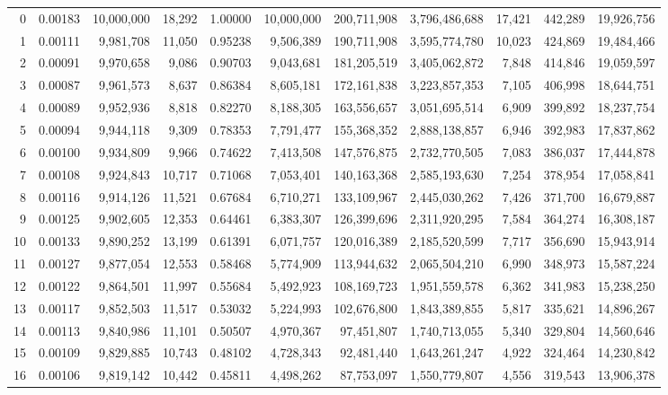 \begin{landscape}
\begin{longtable}{rrrrrrrrrrr}
0 & 0.00183 & 10,000,000 & 18,292 & 1.00000 & 10,000,000 & 200,711,908 & 3,796,486,688 & 17,421 & 442,289 & 19,926,756 \\
1 & 0.00111 & 9,981,708 & 11,050 & 0.95238 & 9,506,389 & 190,711,908 & 3,595,774,780 & 10,023 & 424,869 & 19,484,466 \\
2 & 0.00091 & 9,970,658 & 9,086 & 0.90703 & 9,043,681 & 181,205,519 & 3,405,062,872 & 7,848 & 414,846 & 19,059,597 \\
3 & 0.00087 & 9,961,573 & 8,637 & 0.86384 & 8,605,181 & 172,161,838 & 3,223,857,353 & 7,105 & 406,998 & 18,644,751 \\
4 & 0.00089 & 9,952,936 & 8,818 & 0.82270 & 8,188,305 & 163,556,657 & 3,051,695,514 & 6,909 & 399,892 & 18,237,754 \\
5 & 0.00094 & 9,944,118 & 9,309 & 0.78353 & 7,791,477 & 155,368,352 & 2,888,138,857 & 6,946 & 392,983 & 17,837,862 \\
6 & 0.00100 & 9,934,809 & 9,966 & 0.74622 & 7,413,508 & 147,576,875 & 2,732,770,505 & 7,083 & 386,037 & 17,444,878 \\
7 & 0.00108 & 9,924,843 & 10,717 & 0.71068 & 7,053,401 & 140,163,368 & 2,585,193,630 & 7,254 & 378,954 & 17,058,841 \\
8 & 0.00116 & 9,914,126 & 11,521 & 0.67684 & 6,710,271 & 133,109,967 & 2,445,030,262 & 7,426 & 371,700 & 16,679,887 \\
9 & 0.00125 & 9,902,605 & 12,353 & 0.64461 & 6,383,307 & 126,399,696 & 2,311,920,295 & 7,584 & 364,274 & 16,308,187 \\
10 & 0.00133 & 9,890,252 & 13,199 & 0.61391 & 6,071,757 & 120,016,389 & 2,185,520,599 & 7,717 & 356,690 & 15,943,914 \\
11 & 0.00127 & 9,877,054 & 12,553 & 0.58468 & 5,774,909 & 113,944,632 & 2,065,504,210 & 6,990 & 348,973 & 15,587,224 \\
12 & 0.00122 & 9,864,501 & 11,997 & 0.55684 & 5,492,923 & 108,169,723 & 1,951,559,578 & 6,362 & 341,983 & 15,238,250 \\
13 & 0.00117 & 9,852,503 & 11,517 & 0.53032 & 5,224,993 & 102,676,800 & 1,843,389,855 & 5,817 & 335,621 & 14,896,267 \\
14 & 0.00113 & 9,840,986 & 11,101 & 0.50507 & 4,970,367 & 97,451,807 & 1,740,713,055 & 5,340 & 329,804 & 14,560,646 \\
15 & 0.00109 & 9,829,885 & 10,743 & 0.48102 & 4,728,343 & 92,481,440 & 1,643,261,247 & 4,922 & 324,464 & 14,230,842 \\
16 & 0.00106 & 9,819,142 & 10,442 & 0.45811 & 4,498,262 & 87,753,097 & 1,550,779,807 & 4,556 & 319,543 & 13,906,378 \\

\end{longtable}
\end{landscape}
